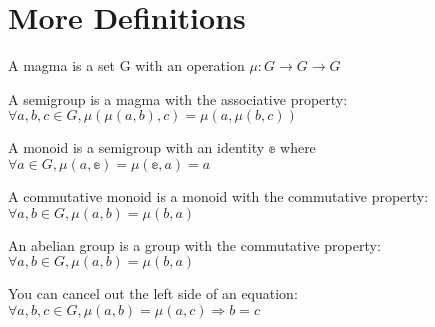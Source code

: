 \section{More Definitions}

\begin{definition}[Magma]
    \label{definition : Magma}
    \leanok
    A magma is a set G with an operation $\mu : G \rightarrow G \rightarrow G$
\end{definition}

\begin{definition}[Semigroup]
    \label{definition : Semigroup}
    \leanok
    A semigroup is a magma with the associative property: $\forall a, b, c \in G, \mu(\mu(a, b), c) = \mu(a, \mu(b, c))$
\end{definition}

\begin{definition}[Monoid]
    \label{definition : Monoid}
    \leanok
    A monoid is a semigroup with an identity $\mathbb{e}$ where $\forall a \in G, \mu (a, \mathbb{e}) = \mu(\mathbb{e}, a) = a$
\end{definition}

\begin{definition}
    \label{definition : CommMonoid}
    \leanok
    A commutative monoid is a monoid with the commutative property: $\forall a, b \in G, \mu(a, b) = \mu(b, a)$
\end{definition}

\begin{definition}
    \label{definition : AbelianGroup}
    \leanok
    An abelian group is a group with the commutative property: $\forall a, b \in G, \mu(a, b) = \mu(b, a)$
\end{definition}

\begin{theorem}
    \label{definition : left_cancel}
    \leanok
    You can cancel out the left side of an equation:
    $\forall a, b, c \in G, \mu(a, b) = \mu(a, c) \Rightarrow b = c$
\end{theorem}
